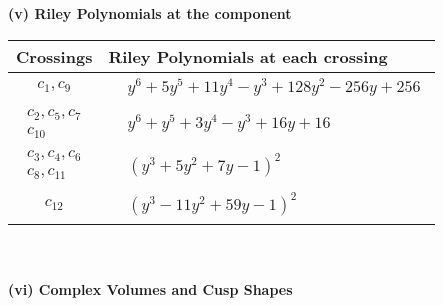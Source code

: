\documentclass[1p]{elsarticle_modified}
\theoremstyle{definition}
\begin{document}
\newpage\renewcommand{\arraystretch}{1}
\flushleft \textbf{(v) Riley Polynomials at the component}\newline \\
\begin{tabular}{m{50pt}|m{274pt}}
Crossings & \hspace{64pt}Riley Polynomials at each crossing \\
\hline $$\begin{aligned}c_{1},c_{9}\end{aligned}$$&$\begin{aligned}
&y^6+5 y^5+11 y^4- y^3+128 y^2-256 y+256
\end{aligned}$\\
\hline $$\begin{aligned}c_{2},c_{5},c_{7}\\c_{10}\end{aligned}$$&$\begin{aligned}
&y^6+y^5+3 y^4- y^3+16 y+16
\end{aligned}$\\
\hline $$\begin{aligned}c_{3},c_{4},c_{6}\\c_{8},c_{11}\end{aligned}$$&$\begin{aligned}
&(y^3+5 y^2+7 y-1)^2
\end{aligned}$\\
\hline $$\begin{aligned}c_{12}\end{aligned}$$&$\begin{aligned}
&(y^3-11 y^2+59 y-1)^2
\end{aligned}$\\
\hline
\end{tabular}\\~\\
\newpage\flushleft \textbf{(vi) Complex Volumes and Cusp Shapes}
\end{document}
